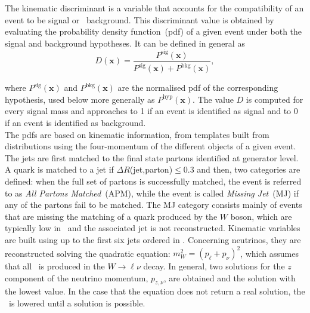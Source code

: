 The kinematic discriminant is a variable that accounts for the compatibility of an event to be signal or \ttbar\ background. This discriminant value is obtained by evaluating the probability density function~(pdf) of a given event under both the signal and background hypotheses. It can be defined in general as
\begin{equation}
    D(\textbf{x})=\frac{P^{\text{sig}}(\textbf{x})}{P^{\text{sig}}(\textbf{x})+P^{\text{bkg}}(\textbf{x})},
    \label{eq3:discriminant}
\end{equation}

where $P^{\text{sig}}(\textbf{x})$ and $P^{\text{bkg}}(\textbf{x})$ are the normalised pdf of the corresponding hypothesis, used below more generally as $P^{\text{hyp}}(\textbf{x})$. The value $D$ is computed for every signal mass and approaches to 1 if an event is identified as signal and to 0 if an event is identified as background.\\

The pdfs are based on kinematic information, from templates built from distributions using the four-momentum of the different objects of a given event. The jets are first matched to the final state partons identified at generator level. A quark is matched to a jet if $\Delta R$(jet,parton)$\leq 0.3$ and then, two categories are defined: when the full set of partons is successfully matched, the event is referred to as \textit{All Partons Matched}~(APM), while the event is called \textit{Missing Jet}~(MJ) if any of the partons fail to be matched. The MJ category consists mainly of events that are missing the matching of a quark produced by the $W$ boson, which are typically low in \pT\ and the associated jet is not reconstructed. Kinematic variables are built using up to the first six jets ordered in \pT. %
Concerning neutrinos, they are reconstructed solving the quadratic equation: $m_W^2 = (p_\ell + p_\nu)^2$, which assumes that all \MET\ is produced in the $W\to\ell\nu$ decay. In general, two solutions for the $z$ component of the neutrino momentum, $p_{z,\nu}$, are obtained and the solution with the lowest value. In the case that the equation does not return a real solution, the \MET\ is lowered until a solution is possible.\\

